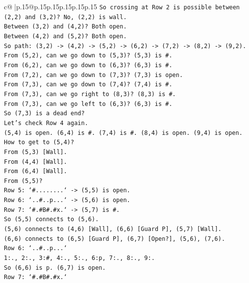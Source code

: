 \documentclass{article}
\begin{document}
{\begin{supertabular}{c@{$\;$}|p{.15\linewidth}@{}p{.15\linewidth}p{.15\linewidth}p{.15\linewidth}p{.15\linewidth}p{.15\linewidth}}
{{{\texttt{So crossing at Row 2 is possible between (2,2) and (3,2)? No, (2,2) is wall.} \\
\texttt{Between (3,2) and (4,2)? Both open.} \\
\texttt{Between (4,2) and (5,2)? Both open.} \\
\texttt{So path: (3,2) {-}> (4,2) {-}> (5,2) {-}> (6,2) {-}> (7,2) {-}> (8,2) {-}> (9,2).} \\
\texttt{From (5,2), can we go down to (5,3)? (5,3) is \#.} \\
\texttt{From (6,2), can we go down to (6,3)? (6,3) is \#.} \\
\texttt{From (7,2), can we go down to (7,3)? (7,3) is open.} \\
\texttt{From (7,3), can we go down to (7,4)? (7,4) is \#.} \\
\texttt{From (7,3), can we go right to (8,3)? (8,3) is \#.} \\
\texttt{From (7,3), can we go left to (6,3)? (6,3) is \#.} \\
\texttt{So (7,3) is a dead end?} \\
\texttt{Let's check Row 4 again.} \\
\texttt{(5,4) is open. (6,4) is \#. (7,4) is \#. (8,4) is open. (9,4) is open.} \\
\texttt{How to get to (5,4)?} \\
\texttt{From (5,3) {[}Wall{]}.} \\
\texttt{From (4,4) {[}Wall{]}.} \\
\texttt{From (6,4) {[}Wall{]}.} \\
\texttt{From (5,5)?} \\
\texttt{Row 5: `\#........` {-}> (5,5) is open.} \\
\texttt{Row 6: `..\#..p...` {-}> (5,6) is open.} \\
\texttt{Row 7: `\#.\#B\#.\#x.` {-}> (5,7) is \#.} \\
\texttt{So (5,5) connects to (5,6).} \\
\texttt{(5,6) connects to (4,6) {[}Wall{]}, (6,6) {[}Guard P{]}, (5,7) {[}Wall{]}.} \\
\texttt{(6,6) connects to (6,5) {[}Guard P{]}, (6,7) {[}Open?{]}, (5,6), (7,6).} \\
\texttt{Row 6: `..\#..p...`} \\
\texttt{1:., 2:., 3:\#, 4:., 5:., 6:p, 7:., 8:., 9:.} \\
\texttt{So (6,6) is p. (6,7) is open.} \\
\texttt{Row 7: `\#.\#B\#.\#x.`} \\
}}}
\end{supertabular}}
\end{document}
